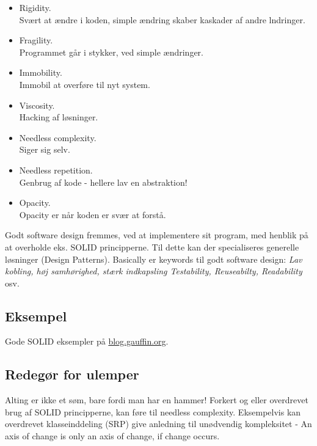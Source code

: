 \begin{itemize}
	\item Rigidity.\\
	Svært at ændre i koden, simple ændring skaber kaskader af andre lndringer.
	\item Fragility.\\
	Programmet går i stykker, ved simple ændringer.
	\item Immobility. \\
	Immobil at overføre til nyt system.
	\item Viscosity.\\
	Hacking af løsninger.
	\item Needless complexity.\\
	Siger sig selv.
	\item Needless repetition.\\
	Genbrug af kode - hellere lav en abstraktion!
	\item Opacity.\\
	Opacity er når koden er svær at forstå.
\end{itemize}

Godt software design fremmes, ved at implementere sit program, med henblik på at overholde eks. SOLID principperne. Til dette kan der specialiseres generelle løsninger (Design Patterns). Basically er keywords til godt software design: \textit{Lav kobling, høj samhørighed, stærk indkapsling Testability, Reuseabilty, Readability} osv.
\subsection{Eksempel}
Gode SOLID eksempler på \href{http://blog.gauffin.org/2012/05/11/solid-principles-with-real-world-examples/}{blog.gauffin.org}.

\subsection{Redegør for ulemper}
Alting er ikke et søm, bare fordi man har en hammer! Forkert og eller overdrevet brug af SOLID principperne, kan føre til needless complexity. Eksempelvis kan overdrevet klasseinddeling (SRP) give anledning til unødvendig kompleksitet - An axis of change is only an axis of change, if change occurs.